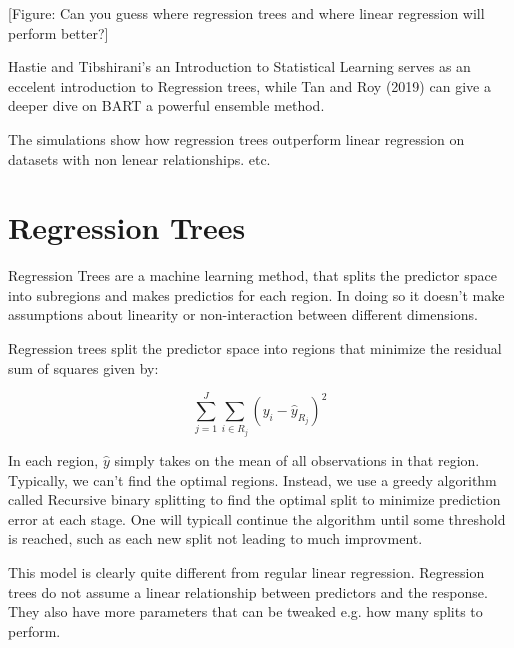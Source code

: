 \documentclass[12pt]{article}
\begin{document}
[Figure: Can you guess where regression trees and where linear regression will perform better?]




Hastie and Tibshirani's an Introduction to Statistical Learning serves as an eccelent introduction to Regression trees, while Tan and Roy (2019) can give a deeper dive on BART a powerful ensemble method. 


The simulations show how regression trees outperform linear regression on datasets with non lenear relationships. etc.






\section{Regression Trees}

Regression Trees are a machine learning method, that splits the predictor space into subregions and makes predictios for each region. In doing so it doesn't make assumptions about linearity or non-interaction between different dimensions.

Regression trees split the predictor space into regions that minimize the residual sum of squares given by:

\begin{equation}
    \sum_{j=1}^{J} \sum_{i \in R_j} ( y_i- \hat{ y}_{R_j} )^2
\end{equation}


In each region, $\hat{y}$ simply takes on the mean of all observations in that region. Typically, we can't find the optimal regions. Instead, we use a greedy algorithm called Recursive binary splitting to find the optimal split to minimize prediction error at each stage. One will typicall continue the algorithm until some threshold is reached, such as each new split not leading to much improvment.

This model is clearly quite different from regular linear regression. Regression trees do not assume a linear relationship between predictors and the response. They also have more parameters that can be tweaked e.g. how many splits to perform. 
\end{document}
